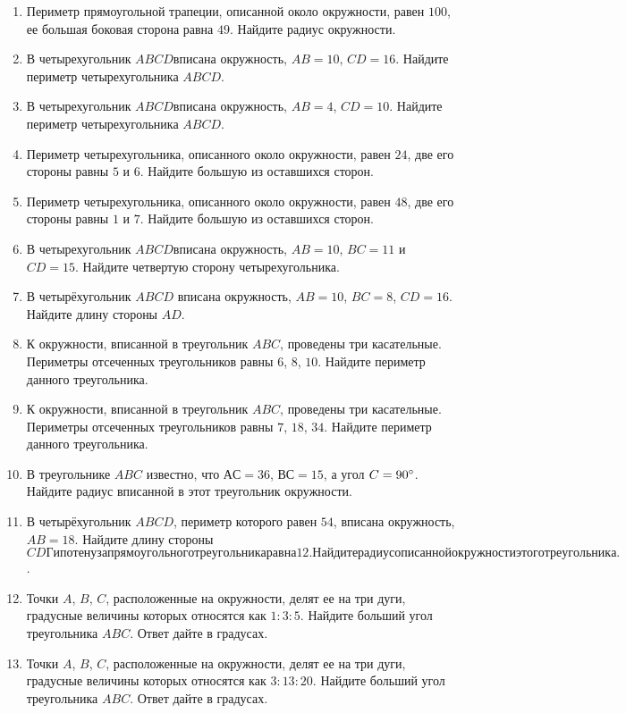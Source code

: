 \documentclass[12pt, a4paper]{article}
\begin{document}
\begin{enumerate}
		\item Периметр прямоугольной трапеции, описанной около окружности, равен \( 100 \), ее большая боковая сторона равна \( 49 \). Найдите радиус окружности.
		\item В четырехугольник \(ABCD\)вписана окружность, \(AB=10\), \(CD=16\). Найдите периметр четырехугольника \(ABCD\).
		\item В четырехугольник \(ABCD\)вписана окружность, \(AB=4\), \(CD=10\). Найдите периметр четырехугольника \(ABCD\).
		\item Периметр четырехугольника, описанного около окружности, равен \( 24 \), две его стороны равны \( 5  \) и \( 6 \). Найдите большую из оставшихся сторон.
		\item Периметр четырехугольника, описанного около окружности, равен \( 48 \), две его стороны равны \( 1  \) и \( 7 \). Найдите большую из оставшихся сторон.
		\item В четырехугольник \(ABCD\)вписана окружность, \(AB=10\), \( BC=11\) и \( CD=15 \). Найдите четвертую сторону четырехугольника.
		\item В четырёхугольник \( ABCD  \) вписана окружность, \( AB=10 \), \( BC=8 \), \( CD=16 \). Найдите длину стороны \( AD \).
		\item К окружности, вписанной в треугольник \( ABC \), проведены три касательные. Периметры отсеченных треугольников равны \( 6 \), \( 8 \), \( 10 \). Найдите периметр данного треугольника.
		\item К окружности, вписанной в треугольник \( ABC \), проведены три касательные. Периметры отсеченных треугольников равны \( 7 \), \( 18 \), \( 34 \). Найдите периметр данного треугольника.
		\item В треугольнике \( ABC  \) известно, что \( АС = 36 \), \( ВС = 15 \), а угол \( C=90 \degree \). Найдите радиус вписанной в этот треугольник окружности.
		\item В четырёхугольник \(ABCD\), периметр которого равен \( 54 \), вписана окружность, \(AB=18\). Найдите длину стороны \(CDГипотенуза прямоугольного треугольника равна 12. Найдите радиус описанной окружности этого треугольника.\).
		\item Точки \( A \), \( B \), \( C \), расположенные на окружности, делят ее на три дуги, градусные величины которых относятся как \( 1:3:5 \). Найдите больший угол треугольника \( ABC \). Ответ дайте в градусах.
		\item Точки \( A \), \( B \), \( C \), расположенные на окружности, делят ее на три дуги, градусные величины которых относятся как \( 3:13:20 \). Найдите больший угол треугольника \( ABC \). Ответ дайте в градусах.

\end{enumerate}
\end{document}
